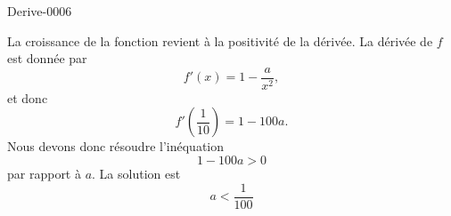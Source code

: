 
\begin{corrige}{Derive-0006}

    La croissance de la fonction revient à la positivité de la dérivée. La dérivée de $f$ est donnée par
    \begin{equation}
        f'(x)=1-\frac{ a }{ x^2 },
    \end{equation}
    et donc
    \begin{equation}
        f'\left( \frac{1}{ 10 } \right)=1-100a.
    \end{equation}
    Nous devons donc résoudre l'inéquation
    \begin{equation}
        1-100a>0
    \end{equation}
    par rapport à $a$. La solution est 
    \begin{equation}
        a<\frac{1}{ 100 }
    \end{equation}
    

\end{corrige}
